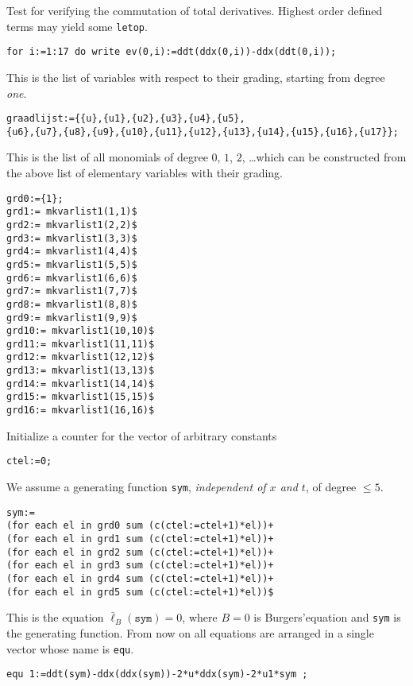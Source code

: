 \documentclass[12pt]{amsart}
\theoremstyle{definition}
\begin{document}
Test for verifying the commutation of total derivatives.
Highest order defined terms may yield some \texttt{letop}.
\begin{verbatim}
for i:=1:17 do write ev(0,i):=ddt(ddx(0,i))-ddx(ddt(0,i));
\end{verbatim}

This is the list of variables with respect to their grading,
starting from degree \emph{one}.
\begin{verbatim}
graadlijst:={{u},{u1},{u2},{u3},{u4},{u5},
{u6},{u7},{u8},{u9},{u10},{u11},{u12},{u13},{u14},{u15},{u16},{u17}};
\end{verbatim}

This is the list of all monomials of degree $0$, $1$, $2$, \dots which can be
constructed from the above list of elementary variables with their grading.
\begin{verbatim}
grd0:={1};
grd1:= mkvarlist1(1,1)$
grd2:= mkvarlist1(2,2)$
grd3:= mkvarlist1(3,3)$
grd4:= mkvarlist1(4,4)$
grd5:= mkvarlist1(5,5)$
grd6:= mkvarlist1(6,6)$
grd7:= mkvarlist1(7,7)$
grd8:= mkvarlist1(8,8)$
grd9:= mkvarlist1(9,9)$
grd10:= mkvarlist1(10,10)$
grd11:= mkvarlist1(11,11)$
grd12:= mkvarlist1(12,12)$
grd13:= mkvarlist1(13,13)$
grd14:= mkvarlist1(14,14)$
grd15:= mkvarlist1(15,15)$
grd16:= mkvarlist1(16,16)$
\end{verbatim}

Initialize a counter for the vector of arbitrary constants
\begin{verbatim}
ctel:=0;
\end{verbatim}

We assume a generating function \texttt{sym}, \emph{independent of $x$ and
  $t$}, of degree $\leq 5$.
\begin{verbatim}
sym:=
(for each el in grd0 sum (c(ctel:=ctel+1)*el))+
(for each el in grd1 sum (c(ctel:=ctel+1)*el))+
(for each el in grd2 sum (c(ctel:=ctel+1)*el))+
(for each el in grd3 sum (c(ctel:=ctel+1)*el))+
(for each el in grd4 sum (c(ctel:=ctel+1)*el))+
(for each el in grd5 sum (c(ctel:=ctel+1)*el))$
\end{verbatim}

This is the equation $\bar\ell_B(\mathtt{sym})=0$, where $B=0$ is
Burgers'equation and \texttt{sym} is the generating function. From now on all
equations are arranged in a single vector whose name is \texttt{equ}.
\begin{verbatim}
equ 1:=ddt(sym)-ddx(ddx(sym))-2*u*ddx(sym)-2*u1*sym ;
\end{verbatim}
\end{document}
